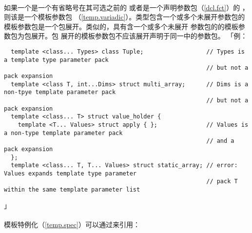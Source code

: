 \paragraph{}
如果一个是一个有省略号在其可选之前的
或者是一个声明参数包（\ref{dcl.fct}）的
，则该是一个模板参数包
（\ref{temp.variadic}）。类型包含一个或多个未展开参数包的
模板参数包是一个包展开。类似的，具有含一个或多个未展开
参数包的的模板参数包为包展开。包
展开的模板参数包不应该展开声明于同一中的参数包。
「例：
\begin{lstlisting}
  template <class... Types> class Tuple;                  // Types is a template type parameter pack
                                                          // but not a pack expansion
  template <class T, int...Dims> struct multi_array;      // Dims is a non-tpye template parameter pack
                                                          // but not a pack expansion
  template <class... T> struct value_holder {
    template <T... Values> struct apply { };              // Values is a non-type template parameter pack
                                                          // and a pack expansion
  };
  template <class... T, T... Values> struct static_array; // error: Values expands template type parameter
                                                          // pack T within the same template parameter list
\end{lstlisting}」

\paragraph{}
模板特例化（\ref{temp.spec}）可以通过来引用：


